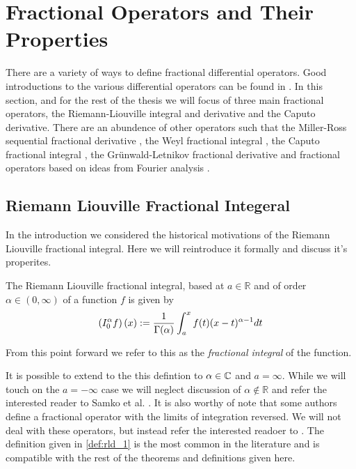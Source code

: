 \section{Fractional Operators and Their Properties}
There are a variety of ways to define fractional differential operators. Good introductions to the various differential operators can be found in \cite{Gorenflo1997, Podlubny1999, Diethelm2002, Samko1993}. In this section, and for the rest of the thesis we will focus of three main fractional operators, the Riemann-Liouville integral and derivative and the Caputo derivative. There are an abundence of other operators such that the Miller-Ross sequential fractional derivative \cite{Miller1993, Podlubny1999}, the Weyl fractional integral \cite{Gorenflo1997, Samko1993, Raina1979}, the Caputo fractional integral \cite{Gorenflo1997}, the Gr{\"u}nwald-Letnikov fractional derivative \cite{Podlubny1999, Samko1993} and fractional operators based on ideas from Fourier analysis \cite{Narayanan2003, Samko1993}.


\subsection{Riemann Liouville Fractional Integeral}
In the introduction we considered the historical motivations of the Riemann Liouville fractional integral. Here we will reintroduce it formally and discuss it's properites.

\begin{definition}
\label{def:rld_1}
The Riemann Liouville fractional integral, based at $ a \in \mathbb{R} $ and of order $ \alpha \in (0, \infty) $ of a function $ f $ is given by
\begin{align}
    \label{eq:rld_1}
    \left( I_{0}^{\alpha} f \right)(x) := \frac{1}{\Gamma(\alpha)} \int_a^x f(t)(x-t)^{\alpha - 1} dt
\end{align}
\end{definition}
From this point forward we refer to this as the \emph{fractional integral} of the function.

It is possible to extend to the this defintion to $ \alpha \in \mathbb{C} $ and $ a = \infty $. While we will touch on the $ a = -\infty $ case we will neglect discussion of $ \alpha \not\in \mathbb{R} $ and refer the interested reader to Samko et al. \cite{Samko1993}.  It is also worthy of note that some authors define a fractional operator with the limits of integration reversed. We will not deal with these operators, but instead refer the interested readoer to \cite{Samko1993, Podlubny1999}. The definition given in \ref{def:rld_1} is the most common in the literature and is compatible with the rest of the theorems and definitions given here.

